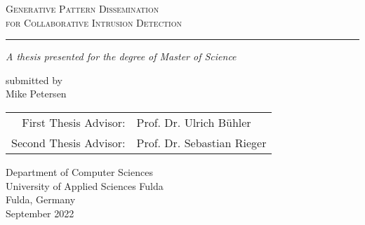 \documentclass[../main.tex]{subfiles}
\begin{document}
    
\newcommand\BackgroundPic{%
\put(0,-170){%
\parbox[b][\paperheight]{\paperwidth}{%
\vfill
\centering
{\transparent{0.05} }%
\vfill
}}}


\begin{titlepage}
    \begin{center}
        \vspace*{4cm}
            
        \large
        \textsc{\textcolor{ai_blue}{Generative Pattern Dissemination \\
        for Collaborative Intrusion Detection}}

        \textcolor{ai_blue}{\rule{12.5cm}{.1mm}}
                        
        \normalsize
        \textit{A thesis presented for the degree of Master of Science}

        \vspace*{3cm}
        submitted by \\
        Mike Petersen
        
        \vspace{1cm}
        
        \begin{tabular}{rl}
            First Thesis Advisor:  & Prof. Dr. Ulrich Bühler     \\
            Second Thesis Advisor: & Prof. Dr. Sebastian Rieger 
        \end{tabular}
            
        \vspace*{3cm}

        \begin{figure}[H]
            \centering
            \def\svgwidth{4cm}
             
        \end{figure}  
            
        \normalsize
        Department of Computer Sciences\\
        University of Applied Sciences Fulda\\
        Fulda, Germany\\
        September 2022
            
    \end{center}
\end{titlepage}
\end{document}

